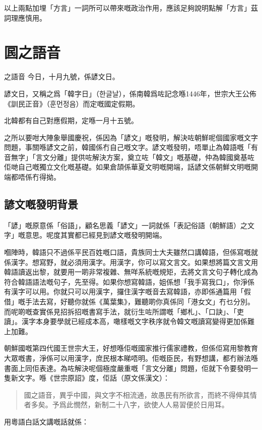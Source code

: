 以上兩點加埋「方言」一詞所可以帶來嘅政治作用，應該足夠說明點解「方言」茲詞理應慎用。




\section{囻之語音}

之語音
今日，十月九號，係諺文日。

諺文日，又稱之爲「韓字日」（{\koreanfont 한글날}），係南韓爲咗記念喺1446年，世宗大王公佈《訓民正音》（{\koreanfont 훈먼정음}）而定嘅國定假期。

北韓都有自己對應假期，定喺一月十五號。

之所以要咁大陣象舉國慶祝，係因為「諺文」嘅發明，解決咗朝鮮呢個國家嘅文字問題，事關喺諺文之前，韓國係冇自己嘅文字。諺文嘅發明，唔單止為韓語嘅「有音無字」「言文分離」提供咗解決方案，奠立咗「韓文」嘅基礎，仲為韓國奠基咗佢哋自己嘅獨立文化嘅基礎。如果倉頡係華夏文明嘅開端，話諺文係朝鮮文明嘅開端都唔係冇得拗。

\subsection*{諺文嘅發明背景}

「諺」嘅原意係「俗語」，顧名思義「諺文」一詞就係「表記俗語（朝鮮語）之文字」嘅意思。呢度其實都已經見到諺文嘅發明開端。

嗰陣時，韓語只不過係平民百姓嘅口語，貴族同士大夫雖然口講韓語，但係寫嘅就係漢字。想寫野，就必須用漢字。用漢字，你可以寫文言文。如果想將篇文言文用韓語讀返出黎，就要用一啲非常複雜、無咩系統嘅規矩，去將文言文句子轉化成為符合韓語語法嘅句子，先至得。如果你想寫韓語，姐係想「我手寫我口」，你淨係有漢字可以用。你就只可以用漢字，攞住漢字嘅音去寫韓語，亦即係通篇用「假借」嘅手法去寫，好聽你就係《萬葉集》，難聽啲你真係同「港女文」冇乜分別。而呢啲嘅查實係見招拆招嘅書寫手法，就衍生咗所謂嘅「鄉札」、「口訣」、「吏讀」。漢字本身要學就已經成本高，噉樣嘅文字秩序就令韓文嘅讀寫變得更加係難上加難。

朝鮮國嘅第四代國王世宗大王，好想喺佢嘅國家推行儒家禮教，但係佢寫用黎教育大眾嘅書，淨係可以用漢字，庶民根本睇唔明。佢嘅臣民，有野想講，都冇辦法喺書面上同佢表達。為咗解決呢個極度嚴重嘅「言文分離」問題，佢就下令要發明一隻新文字。喺《世宗原詔》度，佢話（原文係漢文）：
\begin{quotation}
  國之語音，異乎中國，與文字不相流通，故愚民有所欲言，而終不得伸其情者多矣。予爲此憫然，新制二十八字，欲使人人易習便於日用耳。

\end{quotation}
用粵語白話文講嘅話就係：


